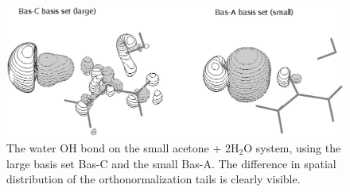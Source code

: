 \begin{figure}[ht]
\begin{center}
\includegraphics[width=12cm,keepaspectratio]{02_localization/images/acetone_tails.eps}
\caption{\footnotesize The water OH bond on the small acetone +
2H$_2$O system, using the large basis set Bas-C and the small Bas-A. The
difference in spatial distribution of the orthonormalization tails is
clearly visible. }
\label{fig:acetone_tails}
\end{center}
\end{figure}
